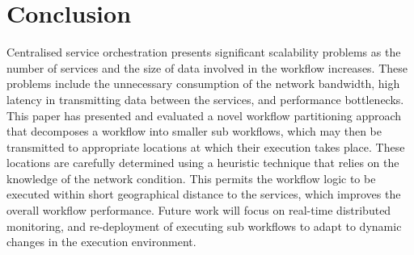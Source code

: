 \documentclass[10pt, conference, compsocconf]{IEEEtran}
\begin{document}
\section{Conclusion}\label{Conclusion}

Centralised service orchestration presents significant scalability problems as the number of services and the size of data involved in the workflow increases.
These problems include the unnecessary consumption of the network bandwidth, high latency in transmitting data between the services, and performance bottlenecks.
This paper has presented and evaluated a novel workflow partitioning approach that decomposes a workflow into smaller sub workflows, which may then be transmitted to appropriate locations at which their execution takes place.
These locations are carefully determined using a heuristic technique that relies on the knowledge of the network condition.
This permits the workflow logic to be executed within short geographical distance to the services, which improves the overall workflow performance.
Future work will focus on real-time distributed monitoring, and re-deployment of executing sub workflows to adapt to dynamic changes in the execution environment.

\nocite{*}


\end{document}
